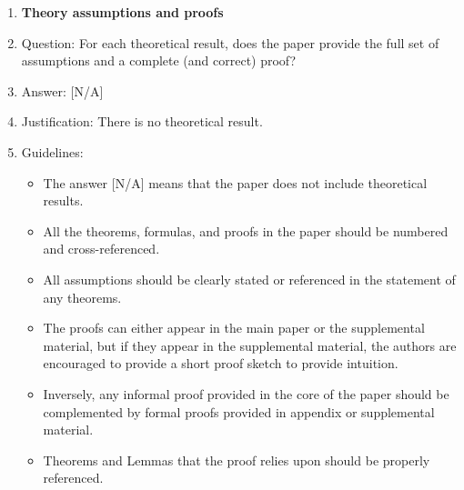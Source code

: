 \documentclass{llmxive}
\providecommand{\answerYes}[1][]{[Yes]#1}
\providecommand{\answerNo}[1][]{[No]#1}
\providecommand{\answerNA}[1][]{[N/A]#1}
\begin{document}
{\begin{enumerate}
\item {\bf Theory assumptions and proofs}
    \item[] Question: For each theoretical result, does the paper provide the full set of assumptions and a complete (and correct) proof?
    \item[] Answer: \answerNA{} %
    \item[] Justification: There is no theoretical result.
    \item[] Guidelines:
    \begin{itemize}
        \item The answer \answerNA{} means that the paper does not include theoretical results. 
        \item All the theorems, formulas, and proofs in the paper should be numbered and cross-referenced.
        \item All assumptions should be clearly stated or referenced in the statement of any theorems.
        \item The proofs can either appear in the main paper or the supplemental material, but if they appear in the supplemental material, the authors are encouraged to provide a short proof sketch to provide intuition. 
        \item Inversely, any informal proof provided in the core of the paper should be complemented by formal proofs provided in appendix or supplemental material.
        \item Theorems and Lemmas that the proof relies upon should be properly referenced. 
    \end{itemize}


\end{enumerate}}
\end{document}
